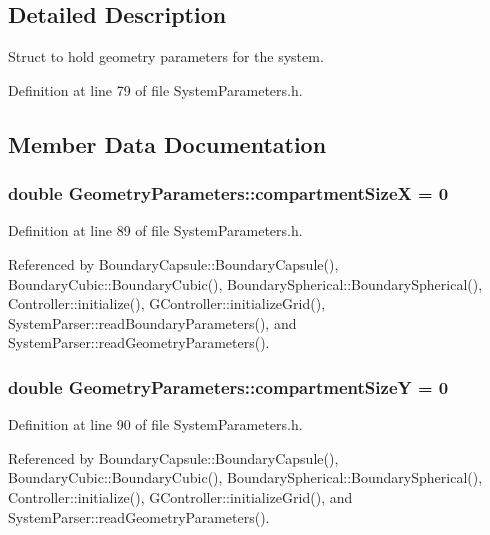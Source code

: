 \subsection{Detailed Description}
Struct to hold geometry parameters for the system. 

Definition at line 79 of file System\+Parameters.\+h.



\subsection{Member Data Documentation}
\hypertarget{structGeometryParameters_a74845fb942433ad543c1cb7ff437da2f}{
\subsubsection[{compartment\+Size\+X}]{\setlength{\rightskip}{0pt plus 5cm}double Geometry\+Parameters\+::compartment\+Size\+X = 0}}\label{structGeometryParameters_a74845fb942433ad543c1cb7ff437da2f}


Definition at line 89 of file System\+Parameters.\+h.



Referenced by Boundary\+Capsule\+::\+Boundary\+Capsule(), Boundary\+Cubic\+::\+Boundary\+Cubic(), Boundary\+Spherical\+::\+Boundary\+Spherical(), Controller\+::initialize(), G\+Controller\+::initialize\+Grid(), System\+Parser\+::read\+Boundary\+Parameters(), and System\+Parser\+::read\+Geometry\+Parameters().

\hypertarget{structGeometryParameters_a6364473fe0575150e254838e4c91e610}{
\subsubsection[{compartment\+Size\+Y}]{\setlength{\rightskip}{0pt plus 5cm}double Geometry\+Parameters\+::compartment\+Size\+Y = 0}}\label{structGeometryParameters_a6364473fe0575150e254838e4c91e610}


Definition at line 90 of file System\+Parameters.\+h.



Referenced by Boundary\+Capsule\+::\+Boundary\+Capsule(), Boundary\+Cubic\+::\+Boundary\+Cubic(), Boundary\+Spherical\+::\+Boundary\+Spherical(), Controller\+::initialize(), G\+Controller\+::initialize\+Grid(), and System\+Parser\+::read\+Geometry\+Parameters().

